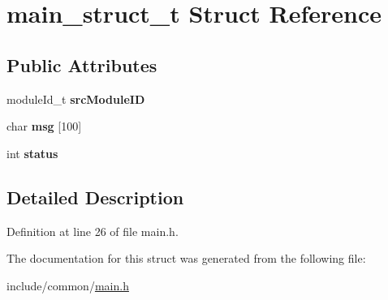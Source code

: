 \hypertarget{structmain__struct__t}{}\section{main\+\_\+struct\+\_\+t Struct Reference}
\label{structmain__struct__t}
\subsection*{Public Attributes}
\begin{DoxyCompactItemize}
\item 
\mbox{\label{structmain__struct__t_a4c52ba181aa633dd772305cfc13c3fdf}} 
module\+Id\+\_\+t {\bfseries src\+Module\+ID}
\item 
\mbox{\label{structmain__struct__t_ad4138206cfaf1bf5c314b872cb7765ef}} 
char {\bfseries msg} \mbox{[}100\mbox{]}
\item 
\mbox{\label{structmain__struct__t_a7621e814158ca8929253263df4cba606}} 
int {\bfseries status}
\end{DoxyCompactItemize}


\subsection{Detailed Description}


Definition at line 26 of file main.\+h.



The documentation for this struct was generated from the following file\+:\begin{DoxyCompactItemize}
\item 
include/common/\hyperlink{main_8h}{main.\+h}\end{DoxyCompactItemize}
